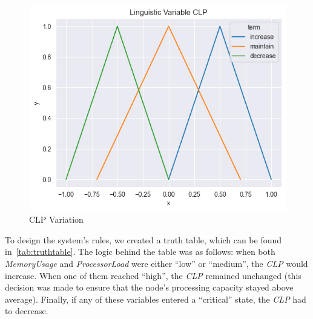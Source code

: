 \documentclass[titlepage]{article}
\begin{document}
\begin{figure}[H]
\begin{minipage}{0.32\textwidth}
    \end{minipage}
    \hfill
    \begin{minipage}{0.32\textwidth}
        \centering
        \includegraphics[width=\textwidth]{../images/triangular_CLP}
        \caption{CLP Variation}
        \label{fig:clp}
    \end{minipage}
\end{figure}
\vspace{8mm}

To design the system's rules, we created a truth table, which can be found in~\vref{tab:truthtable}.
The logic behind the table was as follows: when both \textit{MemoryUsage} and \textit{ProcessorLoad} were either ``low'' or ``medium'', the \textit{CLP} would increase.
When one of them reached ``high'', the \textit{CLP} remained unchanged (this decision was made to ensure that the node's processing capacity stayed above average).
Finally, if any of these variables entered a ``critical'' state, the \textit{CLP} had to decrease.
\end{document}
